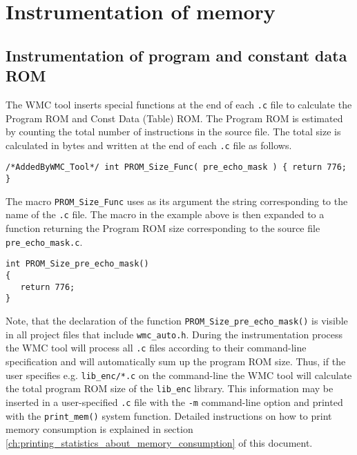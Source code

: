 \section{Instrumentation of memory}
\label{ch:instrumentation_of_memory}

\subsection{Instrumentation of program and constant data ROM}

The WMC tool inserts special functions at the end of each \verb|.c| file to calculate the Program ROM and Const Data (Table) ROM. The Program ROM is estimated by counting the total number of instructions in the source file. The total size is calculated in bytes and written at the end of each \verb|.c| file as follows.

\begin{Verbatim}[fontsize=\small]
/*AddedByWMC_Tool*/ int PROM_Size_Func( pre_echo_mask ) { return 776; }
\end{Verbatim}

The macro \verb|PROM_Size_Func| uses as its argument the string corresponding to the name of the \verb|.c| file. The macro in the example above is then expanded to a function returning the Program ROM size corresponding to the source file \verb|pre_echo_mask.c|.

\begin{Verbatim}[fontsize=\small]
int PROM_Size_pre_echo_mask()
{
   return 776;
}
\end{Verbatim}

Note, that the declaration of the function \verb|PROM_Size_pre_echo_mask()| is visible in all project files that include \verb|wmc_auto.h|. During the instrumentation process the WMC tool will process all \verb|.c| files according to their command-line specification and will automatically sum up the program ROM size. Thus, if the user specifies e.g. \verb|lib_enc/*.c| on the command-line the WMC tool will calculate the total program ROM size of the \verb|lib_enc| library. This information may be inserted in a user-specified \verb|.c| file with the \verb|-m| command-line option and printed with the \verb|print_mem()| system function. Detailed instructions on how to print memory consumption is explained in section \ref{ch:printing_statistics_about_memory_consumption} of this document.


